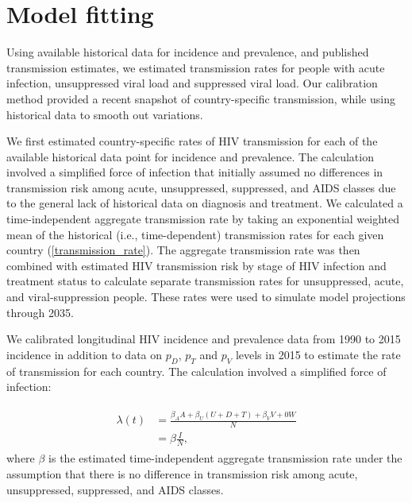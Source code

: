 \documentclass{article}
\begin{document}
\section{Model fitting}
\label{model_fitting}

Using available historical data for incidence and prevalence, and
published transmission estimates, we estimated transmission rates for
people with acute infection, unsuppressed viral load and suppressed
viral load. Our calibration method provided a recent snapshot of
country-specific transmission, while using historical data to smooth
out variations.

We first estimated country-specific rates of HIV transmission for each
of the available historical data point for incidence and
prevalence. The calculation involved a simplified force of infection
that initially assumed no differences in transmission risk among
acute, unsuppressed, suppressed, and AIDS classes due to the general
lack of historical data on diagnosis and treatment. We calculated a
time-independent aggregate transmission rate by taking an exponential
weighted mean of the historical (i.e., time-dependent) transmission
rates for each given country (\autoref{transmission_rate}). The
aggregate transmission rate was then combined with estimated HIV
transmission risk by stage of HIV infection
\cite{Hollingsworth2008-iy} and treatment status \cite{Wawer2005-us}
to calculate separate transmission rates for unsuppressed, acute, and
viral-suppression people. These rates were used to simulate model
projections through 2035.



{We calibrated longitudinal HIV incidence and prevalence data from
  1990 to 2015 incidence in addition to data on $p_{D}$, $p_{T}$ and
  $p_{V}$ levels in 2015 to estimate the rate of transmission for each
  country. The calculation involved a simplified force of infection:}

\begin{align}
  \label{foi}
  \begin{split}
  \lambda(t) &  =    \frac{\beta_{A} A + \beta_{U}(U+D+T)+\beta_{V}V+0
               W}{N} \\
             &  =  \beta \frac{I}{N},
             \end{split}
\end{align}
where $\beta$ is the estimated time-independent aggregate transmission rate under the
assumption that there is no difference in transmission risk among acute, unsuppressed, suppressed, and AIDS classes.
\end{document}
